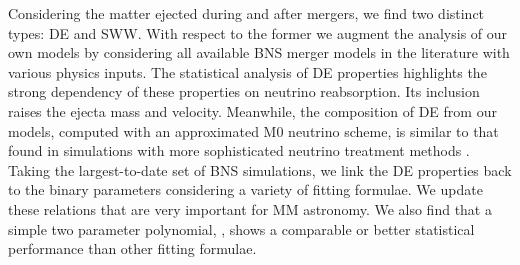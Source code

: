 Considering the matter ejected during and after mergers, we find 
two distinct types: \ac{DE} and \pmerg{} \ac{SWW}. 
With respect to the former 
we augment the analysis of our own models by considering all 
available \ac{BNS} merger models in the literature with various physics inputs. 
The statistical analysis of \ac{DE} properties highlights the strong 
dependency of these properties on neutrino reabsorption. 
Its inclusion raises the ejecta mass and velocity. 
Meanwhile, the composition of \ac{DE}  
from our models, computed with an approximated M0 neutrino scheme, 
is similar to that found in simulations with more sophisticated neutrino treatment 
methods \citep{Sekiguchi:2016bjd,Vincent:2019kor}. 
Taking the largest-to-date set of \ac{BNS} simulations, we link the \ac{DE} properties 
back to the binary parameters considering a variety of fitting formulae.  
We update these relations that are very important for \ac{MM} astronomy. 
We also find that a simple two parameter polynomial, \polql{}, shows a comparable or 
better statistical performance than other fitting formulae.

%
%

